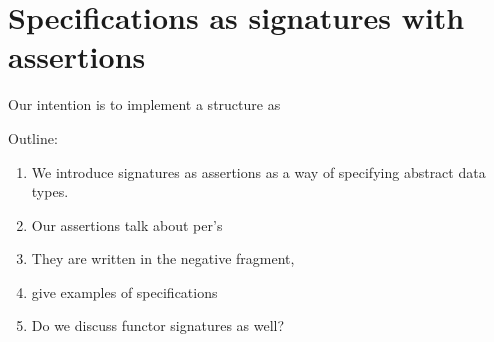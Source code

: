 \section{Specifications as signatures with assertions}
\label{sec:spec-sign}

Our intention is to implement a structure as 





Outline:
%
\begin{enumerate}
\item We introduce signatures as assertions as a way of specifying
  abstract data types.
\item Our assertions talk about per's
\item They are written in the negative fragment,
\item give examples of specifications
\item Do we discuss functor signatures as well?
\end{enumerate}




